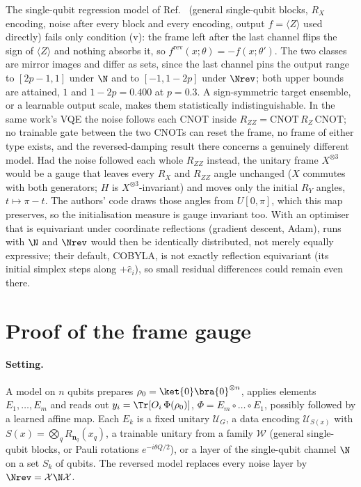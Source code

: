 The single-qubit regression model of Ref.~\cite{vanrossum2026biased} (general
single-qubit blocks, $R_X$ encoding, noise after every block and every encoding, output
$f=\langle Z\rangle$ used directly) fails only condition (v): the frame left after the last
channel flips the sign of $\langle Z\rangle$ and nothing absorbs it, so
$f^{\mathrm{rev}}(x;\theta)=-f(x;\theta')$. The two classes are mirror images and differ as sets,
since the last channel pins the output range to $[2p-1,1]$ under $\N$ and to $[-1,1-2p]$ under
$\Nrev$; both upper bounds are attained, $1$ and $1-2p=0.400$ at $p=0.3$. A sign-symmetric target ensemble, or a learnable output scale,
makes them statistically indistinguishable. In the same work's VQE the noise follows each
CNOT inside $R_{ZZ}=\mathrm{CNOT}\,R_Z\,\mathrm{CNOT}$; no trainable gate between the two CNOTs
can reset the frame, no frame of either type exists, and the reversed-damping result there
concerns a genuinely different model. Had the noise followed each whole $R_{ZZ}$ instead, the
unitary frame $X^{\otimes 3}$ would be a gauge that leaves every $R_X$ and $R_{ZZ}$ angle
unchanged ($X$ commutes with both generators; $H$ is $X^{\otimes3}$-invariant) and moves only
the initial $R_Y$ angles, $t\mapsto\pi-t$. The authors' code draws those angles from
$U[0,\pi]$, which this map preserves, so the initialisation measure is gauge invariant too.
With an optimiser that is equivariant under coordinate reflections (gradient descent, Adam),
runs with $\N$ and $\Nrev$ would then be identically distributed, not merely equally
expressive; their default, COBYLA, is not exactly reflection equivariant (its initial simplex
steps along $+\hat e_i$), so small residual differences could remain even there.

\section{Proof of the frame gauge}
\label{app:gauge}

\paragraph{Setting.}
A model on $n$ qubits prepares $\rho_0=\ket{0}\bra{0}^{\otimes n}$, applies elements
$E_1,\dots,E_m$ and reads out $y_i=\Tr[O_i\,\Phi(\rho_0)]$, $\Phi=E_m\circ\dots\circ E_1$, possibly
followed by a learned affine map. Each $E_k$ is a fixed unitary $\mathcal U_G$, a data encoding
$\mathcal U_{S(x)}$ with $S(x)=\bigotimes_q R_{\mathbf n_q}(x_q)$, a trainable unitary from a
family $\mathcal W$ (general single-qubit blocks, or Pauli rotations $e^{-i\theta Q/2}$), or a
layer of the single-qubit channel $\N$ on a set $S_k$ of qubits. The reversed model
replaces every noise layer by $\Nrev=\mathcal X\N\mathcal X$.

